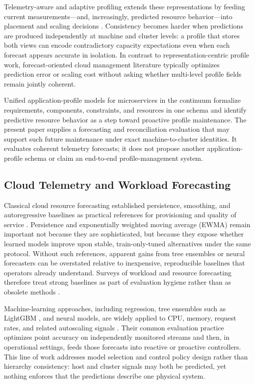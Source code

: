 \documentclass[a4paper,fleqn]{cas-dc}
\begin{document}
Telemetry-aware and adaptive profiling extends these representations by feeding
current measurements---and, increasingly, predicted resource behavior---into
placement and scaling decisions
\cite{taherizadeh2018monitoring,duc2020survey}.
Consistency becomes harder when predictions are produced independently at
machine and cluster levels: a profile that stores both views can encode
contradictory capacity expectations even when each forecast appears accurate in
isolation.
In contrast to representation-centric profile work, forecast-oriented cloud
management literature typically optimizes prediction error or scaling cost
without asking whether multi-level profile fields remain jointly coherent.

Unified application-profile models for microservices in the continuum
formalize requirements, components, constraints, and resources in one schema
and identify predictive resource behavior as a step toward proactive profile
maintenance.
The present paper supplies a forecasting and reconciliation evaluation that may
support such future maintenance under exact machine-to-cluster identities.
It evaluates coherent telemetry forecasts; it does not propose another
application-profile schema or claim an end-to-end profile-management system.

\subsection{Cloud Telemetry and Workload Forecasting}
Classical cloud resource forecasting established persistence, smoothing, and
autoregressive baselines as practical references for provisioning and quality of
service
\cite{calheiros2015workload,islam2012empirical}.
Persistence and exponentially weighted moving average ({EWMA}) remain important
not because they are sophisticated, but because they expose whether learned
models improve upon stable, train-only-tuned alternatives under the same
protocol.
Without such references, apparent gains from tree ensembles or neural forecasters
can be overstated relative to inexpensive, reproducible baselines that operators
already understand.
Surveys of workload and resource forecasting therefore treat strong baselines as
part of evaluation hygiene rather than as obsolete methods
\cite{masdari2020workload,lorido2014review}.

Machine-learning approaches, including regression, tree ensembles such as
LightGBM
\cite{ke2017lightgbm},
and neural models, are widely applied to {CPU}, memory, request rates, and
related autoscaling signals
\cite{khan2022workload,qu2018auto,toka2021kubernetes}.
Their common evaluation practice optimizes point accuracy on independently
monitored streams and then, in operational settings, feeds those forecasts into
reactive or proactive controllers.
This line of work addresses model selection and control policy design rather
than hierarchy consistency: host and cluster signals may both be predicted, yet
nothing enforces that the predictions describe one physical system.
\end{document}
